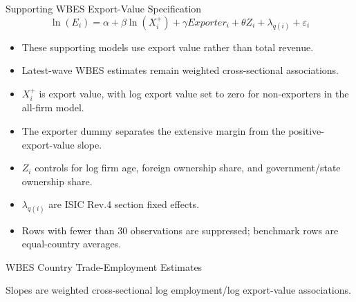 \documentclass[aspectratio=169]{beamer}
\begin{document}
\begin{frame}{Supporting WBES Export-Value Specification}
    \small
    \begin{equation}
        \ln(E_i) = \alpha + \beta \ln(X_i^+) + \gamma Exporter_i
        + \theta Z_i + \lambda_{q(i)} + \varepsilon_i
    \end{equation}

    \begin{itemize}
        \item These supporting models use export value rather than total revenue.
        \item Latest-wave WBES estimates remain weighted cross-sectional associations.
        \item $X_i^+$ is export value, with log export value set to zero for non-exporters in the all-firm model.
        \item The exporter dummy separates the extensive margin from the positive-export-value slope.
        \item $Z_i$ controls for log firm age, foreign ownership share, and government/state ownership share.
        \item $\lambda_{q(i)}$ are ISIC Rev.4 section fixed effects.
        \item Rows with fewer than 30 observations are suppressed; benchmark rows are equal-country averages.
    \end{itemize}
\end{frame}

\begin{frame}{WBES Country Trade-Employment Estimates}
    \vspace{-0.2cm}
    \centering
    \tiny

    \vspace{0.15cm}
    {\scriptsize Slopes are weighted cross-sectional log employment/log export-value associations.}
\end{frame}
\end{document}
